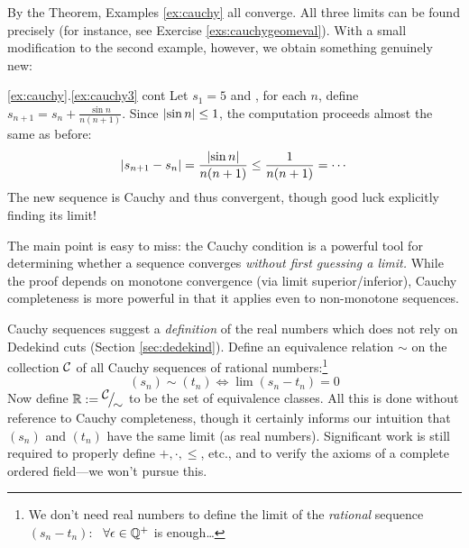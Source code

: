 By the Theorem, Examples \ref{ex:cauchy} all converge. All three limits can be found precisely (for instance, see Exercise \ref{exs:cauchygeomeval}). With a small modification to the second example, however, we obtain something genuinely new:

\begin{example*}{\ref*{ex:cauchy}.\ref{ex:cauchy3} cont}{}
	Let $s_1=5$ and , for each $n$, define $s_{n+1}=s_n+\frac{\sin n}{n(n+1)}$. Since $\left| \sin n\right|\le 1$, the computation proceeds almost the same as before:
	\[
		\left| s_{n+1}-s_n\right|=\frac{\left| \sin n\right|}{n(n+1)}\le \frac 1{n(n+1)}=\cdots
	\]
	The new sequence is Cauchy and thus convergent, though good luck explicitly finding its limit!
\end{example*}

The main point is easy to miss: the Cauchy condition is a powerful tool for determining whether a sequence converges \emph{without first guessing a limit.} While the proof depends on monotone convergence (via limit superior/inferior), Cauchy completeness is more powerful in that it applies even to non-monotone sequences.




Cauchy sequences suggest a \emph{definition} of the real numbers which does not rely on Dedekind cuts (Section \ref{sec:dedekind}).\smallbreak
Define an equivalence relation $\sim$ on the collection $\mathcal{C}$ of all Cauchy sequences of rational numbers:\footnote{%
	We don't need real numbers to define the limit of the \emph{rational} sequence $(s_n-t_n)$: \ $\forall \epsilon\in\mathbb{Q}^+$ is enough\ldots%
}
\[
	(s_n)\sim(t_n)\iff \lim(s_n-t_n)=0
\]
Now define $\mathbb{R}:={}^{\textstyle {\mathcal{C}}}\!\big/_{\textstyle \!{\sim}}$ to be the set of equivalence classes. All this is done without reference to Cauchy completeness, though it certainly informs our intuition that $(s_n)$ and $(t_n)$ have the same limit (as real numbers). Significant work is still required to properly define $+,\cdot,\le$, etc., and to verify the axioms of a complete ordered field---we won't pursue this.


\goodbreak


